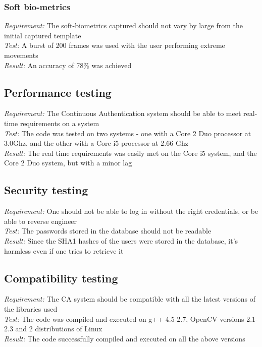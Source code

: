 \documentclass[12pt]{article}			%
\begin{document}
\subsubsection{ Soft bio-metrics }
\emph{ Requirement: } The soft-biometrics captured should not vary by large from the initial captured template\\
\emph{ Test: } A burst of 200 frames was used with the user performing extreme movements\\
\emph{ Result: } An accuracy of 78\% was achieved\\

\subsection{ Performance testing } 
\emph{ Requirement: } The Continuous Authentication system should be able to meet real-time requirements on a system\\
\emph{ Test: } The code was tested on two systems - one with a Core 2 Duo processor at 3.0Ghz, and the other with a Core i5 processor at 2.66 Ghz\\
\emph{ Result: } The real time requirements was easily met on the Core i5 system, and the Core 2 Duo system, but with a minor lag\\

\subsection{ Security testing}
\emph{ Requirement: } One should not be able to log in without the right credentials, or be able to reverse engineer\\
\emph{ Test: } The passwords stored in the database should not be readable\\
\emph{ Result: } Since the SHA1 hashes of the users were stored in the database, it's harmless even if one tries to retrieve it\\

\subsection{ Compatibility testing }
\emph{ Requirement: } The CA system should be compatible with all the latest versions of the libraries used\\
\emph{ Test: } The code was compiled and executed on g++ 4.5-2.7, OpenCV versions 2.1-2.3 and 2 distributions of Linux\\
\emph{ Result: } The code successfully compiled and executed on all the above versions\\
\end{document}
